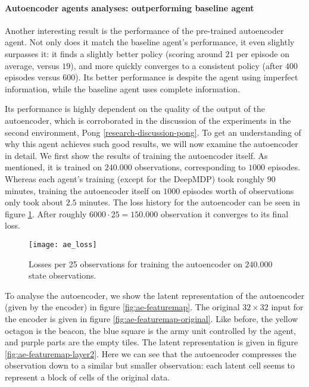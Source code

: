 \paragraph{Autoencoder agents analyses: outperforming baseline agent}
Another interesting result is the performance of the pre-trained autoencoder agent. Not only does it match the baseline agent's performance, it even slightly surpasses it: it finds a slightly better policy (scoring around $21$ per episode on average, versus $19$), and more quickly converges to a consistent policy (after $400$ episodes versus $600$). Its better performance is despite the agent using imperfect information, while the baseline agent uses complete information.

Its performance is highly dependent on the quality of the output of the autoencoder, which is corroborated in the discussion of the experiments in the second environment, Pong \ref{research-discussion-pong}. To get an understanding of why this agent achieves such good results, we will now examine the autoencoder in detail. We first show the results of training the autoencoder itself. As mentioned, it is trained on $240.000$ observations, corresponding to $1000$ episodes. Whereas each agent's training (except for the DeepMDP) took roughly $90$ minutes, training the autoencoder itself on $1000$ episodes worth of observations only took about $2.5$ minutes. The loss history for the autoencoder can be seen in figure \ref{fig:ae-loss}. After roughly $6000 \cdot 25 = 150.000$ observation it converges to its final loss.

\begin{figure}[h!]
    \centering
    \texttt{[image: ae\_loss]}
    \caption{Losses per 25 observations for training the autoencoder on $240.000$ state observations.}
    \label{fig:ae-loss}
\end{figure}

To analyse the autoencoder, we show the latent representation of the autoencoder (given by the encoder) in figure \ref{fig:ae-featuremap}. The original $32 \times 32$ input for the encoder is given in figure \ref{fig:ae-featuremap-original}. Like before, the yellow octagon is the beacon, the blue square is the army unit controlled by the agent, and purple parts are the empty tiles. The latent representation is given in figure \ref{fig:ae-featuremap-layer2}. Here we can see that the autoencoder compresses the observation down to a similar but smaller observation: each latent cell seems to represent a block of cells of the original data. 

